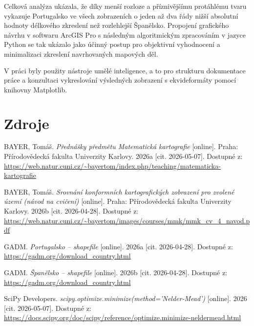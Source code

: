 \documentclass[12pt]{article}
\begin{document}
Celková analýza ukázala, že díky menší rozloze a příznivějšímu protáhlému tvaru vykazuje Portugalsko ve všech zobrazeních o jeden až dva řády nižší absolutní hodnoty délkového zkreslení než rozlehlejší Španělsko. Propojení grafického návrhu v softwaru ArcGIS Pro s následným algoritmickým zpracováním v jazyce Python se tak ukázalo jako účinný postup pro objektivní vyhodnocení a minimalizaci zkreslení navrhovaných mapových děl.

V práci byly použity nástroje umělé inteligence, a to pro strukturu dokumentace práce a konzultaci vykreslování výsledných zobrazení s ekvideformáty pomocí knihovny Matplotlib.
\newpage
\section{Zdroje}
BAYER, Tomáš. \textit{Přednášky předmětu Matematická kartografie} [online]. Praha: Přírodovědecká fakulta Univerzity Karlovy. 2026a [cit. 2026-05-07]. Dostupné z: \url{https://web.natur.cuni.cz/~bayertom/index.php/teaching/matematicka-kartografie}

BAYER, Tomáš. \textit{Srovnání konformních kartografických zobrazení pro zvolené
území (návod na cvičení)} [online]. Praha: Přírodovědecká fakulta Univerzity Karlovy. 2026b [cit. 2026-04-28]. Dostupné z: \url{https://web.natur.cuni.cz/~bayertom/images/courses/mmk/mmk_cv_4_navod.pdf}

GADM. \textit{Portugalsko -- shapefile} [online]. 2026a [cit. 2026-04-28]. Dostupné z: \url{https://gadm.org/download_country.html}

GADM. \textit{Španělsko -- shapefile} [online]. 2026b [cit. 2026-04-28]. Dostupné z: \url{https://gadm.org/download_country.html}

SciPy Developers. \textit{scipy.optimize.minimize(method='Nelder-Mead')} [online]. 2026 [cit. 2026-05-07]. Dostupné z: \url{https://docs.scipy.org/doc/scipy/reference/optimize.minimize-neldermead.html}
\end{document}

